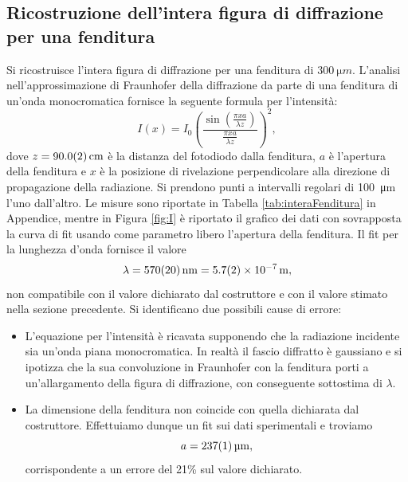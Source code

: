 \documentclass[10pt,oneside,a4paper]{article}
\begin{document}
\begin{multicols}{2}
\section{Ricostruzione dell'intera figura di diffrazione per una fenditura}\label{sec:figura_di_diffrazione}

Si ricostruisce l'intera figura di diffrazione per una fenditura di $\SI{300}{\micro m}$. L'analisi nell'approssimazione di Fraunhofer della diffrazione da parte di una fenditura di un'onda monocromatica fornisce la seguente formula per l'intensità:
\begin{equation}\label{eq:slit_diffraction_figure}
I(x) = I_0\left (\frac{\sin\left(\frac{\pi xa}{\lambda z}\right)}{\frac{\pi xa}{\lambda z}}\right)^2,
\end{equation}
dove $z = \SI{90.0 \pm 0.2}{cm}$ è la distanza del fotodiodo dalla fenditura, $a$ è l'apertura della fenditura e $x$ è la posizione di rivelazione perpendicolare alla direzione di propagazione della radiazione.
Si prendono punti a intervalli regolari di \SI{100}{\micro m} l'uno dall'altro. Le misure sono riportate in Tabella \ref{tab:interaFenditura} in Appendice, mentre in Figura \ref{fig:I} è riportato il grafico dei dati con sovrapposta la curva di fit usando come parametro libero l'apertura della fenditura. Il fit per la lunghezza d'onda fornisce il valore
\[
 \lambda = \SI{570 \pm 20}{nm} = \SI{5.7 \pm 0.2 e-7}{m},
\]
non compatibile con il valore dichiarato dal costruttore e con il valore stimato nella sezione precedente. Si identificano due possibili cause di errore:
\begin{itemize}[label={-}]
\item L'equazione per l'intensità è ricavata supponendo che la radiazione incidente sia un'onda piana monocromatica. In realtà il fascio diffratto è gaussiano e si ipotizza che la sua convoluzione in Fraunhofer con la fenditura porti a un'allargamento della figura di diffrazione, con conseguente sottostima di $\lambda$.
\item La dimensione della fenditura non coincide con quella dichiarata dal costruttore. Effettuiamo dunque un fit sui dati sperimentali e troviamo $$a = \SI{237 \pm 1}{\micro m},$$ corrispondente a un errore del 21\% sul valore dichiarato.
\end{itemize}


\end{multicols}
\end{document}

